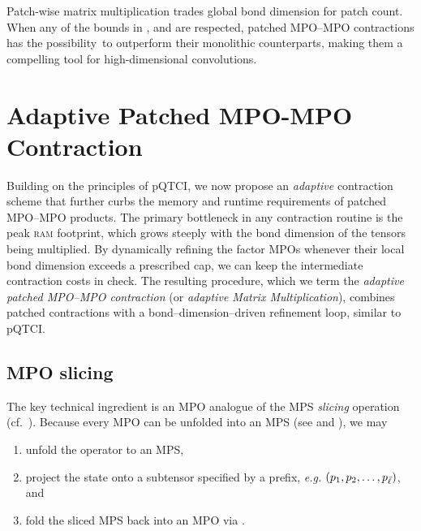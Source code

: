 Patch-wise matrix multiplication trades global bond dimension for patch count.  When any of the bounds in ,  and  are respected, patched MPO–MPO contractions has the possibility\footnotemark\, to outperform their monolithic counterparts, making them a compelling tool for high-dimensional convolutions.
\section{Adaptive Patched MPO-MPO Contraction}
\label{sec:AdaptivePatchMPOMPOContr}

Building on the principles of pQTCI, we now propose an \emph{adaptive} contraction scheme that further curbs the memory and runtime requirements of
patched MPO–MPO products.  
The primary bottleneck in any contraction routine is the peak \textsc{ram} footprint, which grows steeply with the bond dimension of the tensors being multiplied.  By dynamically refining the factor MPOs whenever their local bond dimension exceeds a prescribed cap, we can keep the intermediate contraction costs in check. The resulting procedure, which we term the \emph{adaptive patched MPO–MPO contraction} (or \emph{adaptive Matrix Multiplication}), combines patched contractions with a bond–dimension–driven refinement loop, similar to pQTCI.

\subsection{MPO slicing}
The key technical ingredient is an MPO analogue of the MPS \emph{slicing} operation (cf.\ ).  Because every MPO can be unfolded into an MPS (see  and ), we may

\begingroup
\renewcommand{\labelenumi}{(\roman{enumi})}
\begin{enumerate}
  \item unfold the operator to an MPS,
  \item project the state onto a subtensor specified by a prefix, \textit{e.g.} \((p_{1},p_{2},\dots,p_{{\bar \ell}})\), and
  \item fold the sliced MPS back into an MPO via
     .
\end{enumerate}
\endgroup

